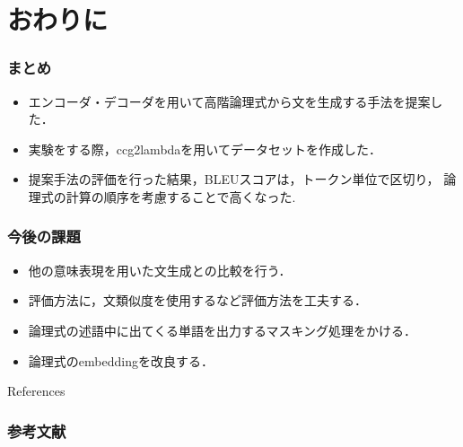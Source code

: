 \documentclass[dvipdfmx]{beamer}
\begin{document}
\section{おわりに}
\begin{frame}
\frametitle{まとめ}
\begin{itemize}
\item エンコーダ・デコーダを用いて高階論理式から文を生成する手法を提案した．
\item 実験をする際，ccg2lambdaを用いてデータセットを作成した．
\item 提案手法の評価を行った結果，BLEUスコアは，トークン単位で区切り，
論理式の計算の順序を考慮することで高くなった.
\end{itemize}

\end{frame}

\begin{frame}
\frametitle{今後の課題}
\begin{itemize}
\item 他の意味表現を用いた文生成との比較を行う．
\item 評価方法に，文類似度を使用するなど評価方法を工夫する．
\item 論理式の述語中に出てくる単語を出力するマスキング処理をかける．
\item 論理式のembeddingを改良する．
\end{itemize}

\end{frame}


\begin{frame}[allowframebreaks]{References}{} %
\frametitle{参考文献}
\fontsize{9pt}{0pt}\selectfont %


\nocite{*}
\fontsize{12pt}{0pt}\selectfont %
\end{frame}


\end{document}
